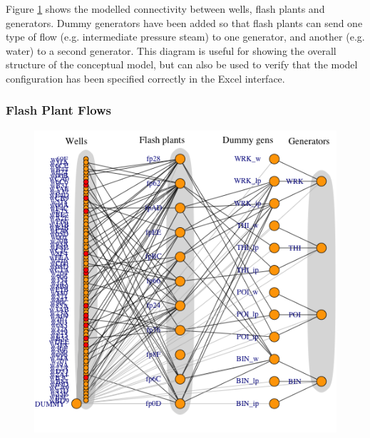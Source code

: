 \documentclass[a4paper, 12pt]{article}
\begin{document}
Figure \ref{fig:full_network} shows the modelled connectivity between wells, flash plants and generators. Dummy generators have been added so that flash plants can send one type of flow (e.g. intermediate pressure steam) to one generator, and another (e.g. water) to a second generator. This diagram is useful for showing the overall structure of the conceptual model, but can also be used to verify that the model configuration has been specified correctly in the Excel interface.

\subsubsection{Flash Plant Flows}

\begin{figure}
\centering
\begin{minipage}[t]{.48\textwidth}
  \centering
  \includegraphics[width=\linewidth]{media/full_network}
  \label{fig:full_network}
\end{minipage}\hfill
\begin{minipage}[t]{.48\textwidth}
  \centering

\end{minipage}
\end{figure}
\end{document}
